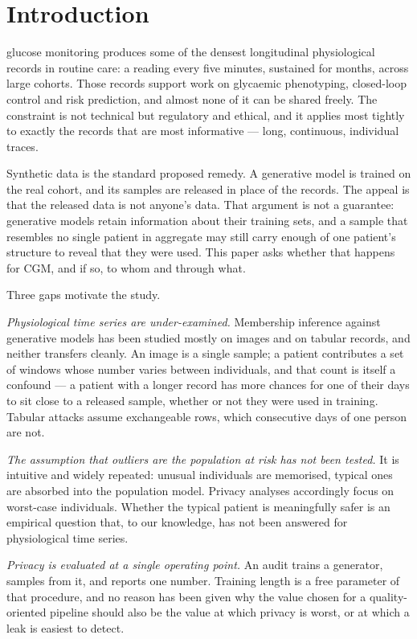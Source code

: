 \documentclass[journal]{IEEEtran}
\begin{document}
\section{Introduction}

 glucose monitoring produces some of the densest longitudinal
physiological records in routine care: a reading every five minutes, sustained for
months, across large cohorts. Those records support work on glycaemic phenotyping,
closed-loop control and risk prediction, and almost none of it can be shared freely. The
constraint is not technical but regulatory and ethical, and it applies most tightly to
exactly the records that are most informative --- long, continuous, individual traces.

Synthetic data is the standard proposed remedy. A generative model is trained on the
real cohort, and its samples are released in place of the records. The appeal is that
the released data is not anyone's data. That argument is not a guarantee: generative
models retain information about their training sets, and a sample that resembles no
single patient in aggregate may still carry enough of one patient's structure to reveal
that they were used. This paper asks whether that happens for CGM, and if so, to whom
and through what.

Three gaps motivate the study.

\emph{Physiological time series are under-examined.} Membership inference against
generative models has been studied mostly on images and on tabular records, and neither
transfers cleanly. An image is a single sample; a patient contributes a set of windows
whose number varies between individuals, and that count is itself a confound --- a
patient with a longer record has more chances for one of their days to sit close to a
released sample, whether or not they were used in training. Tabular attacks assume
exchangeable rows, which consecutive days of one person are not.

\emph{The assumption that outliers are the population at risk has not been tested.} It
is intuitive and widely repeated: unusual individuals are memorised, typical ones are
absorbed into the population model. Privacy analyses accordingly focus on worst-case
individuals. Whether the typical patient is meaningfully safer is an empirical question
that, to our knowledge, has not been answered for physiological time series.

\emph{Privacy is evaluated at a single operating point.} An audit trains a generator,
samples from it, and reports one number. Training length is a free parameter of that
procedure, and no reason has been given why the value chosen for a quality-oriented
pipeline should also be the value at which privacy is worst, or at which a leak is
easiest to detect.
\end{document}
